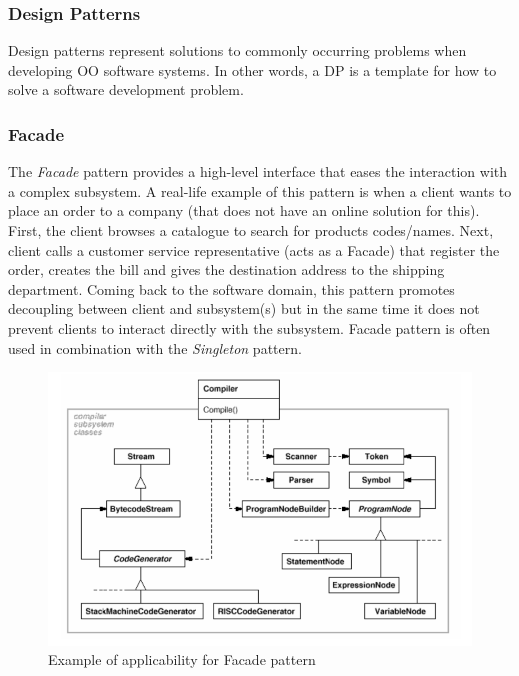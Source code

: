 \documentclass{article}[11]
\begin{document}
	\subsubsection{Design Patterns}
	Design patterns represent solutions to commonly occurring  problems when developing OO software systems. In other words, a DP is a template for how to solve a software development problem.
	\subsubsection{Facade}
	The \emph{Facade} pattern provides a high-level interface that eases the interaction with a complex subsystem. A real-life example of this pattern is when a client wants to place an order to a company (that does not have an online solution for this).  First, the client browses a catalogue to search for products codes/names. Next, client   calls a customer service representative (acts as a Facade) that register the order, creates the bill and gives the destination address to the shipping department. Coming back to the software domain, this pattern promotes decoupling between client and subsystem(s) but in the same time it does not prevent clients to interact directly with the subsystem. Facade pattern is often used in combination with the \emph{Singleton} pattern.
	
	\begin{figure}[H]
		\includegraphics[scale=0.8]{./imgs/Facade}
		\caption{Example of applicability for Facade pattern  \cite{gamma1995design}}
	\end{figure}
	
\end{document}
